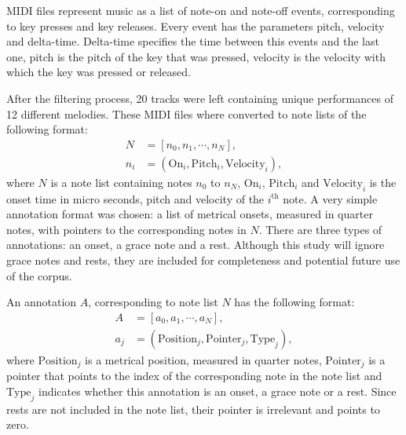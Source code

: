 MIDI files represent music as a list of note-on and note-off events, corresponding to key presses and key releases. Every event has the parameters pitch, velocity and delta-time. Delta-time specifies the time between this events and the last one, pitch is the pitch of the key that was pressed, velocity is the velocity with which the key was pressed or released.


After the filtering process, 20 tracks were left containing unique performances of 12 different melodies. These MIDI files where converted to note lists of the following format:
\begin{align*}
N &= [n_0, n_1, \cdots, n_N],\\
n_i &= (\mathrm{On}_i, \mathrm{Pitch}_i, \mathrm{Velocity}_i),
\end{align*}
where $N$ is a note list containing notes $n_0$ to $n_N$, $\mathrm{On}_i$, $\mathrm{Pitch}_i$ and $\mathrm{Velocity}_i$ is the onset time in micro seconds, pitch and velocity of the $i^{\mathrm{th}}$ note. A very simple annotation format was chosen: a list of metrical onsets, measured in quarter notes, with pointers to the corresponding notes in $N$. There are three types of annotations: an onset, a grace note and a rest. Although this study will ignore grace notes and rests, they are included for completeness and potential future use of the corpus.

An annotation $A$, corresponding to note list $N$ has the following format:
\begin{align*}
A &= [a_0, a_1, \cdots, a_N],\\
a_j &= (\mathrm{Position}_j, \mathrm{Pointer}_j, \mathrm{Type}_j),
\end{align*}
where $\mathrm{Position}_j$ is a metrical position, measured in quarter notes, $\mathrm{Pointer}_j$ is a pointer that points to the index of the corresponding note in the note list and $\mathrm{Type}_j$ indicates whether this annotation is an onset, a grace note or a rest. Since rests are not included in the note list, their pointer is irrelevant and points to zero. 

